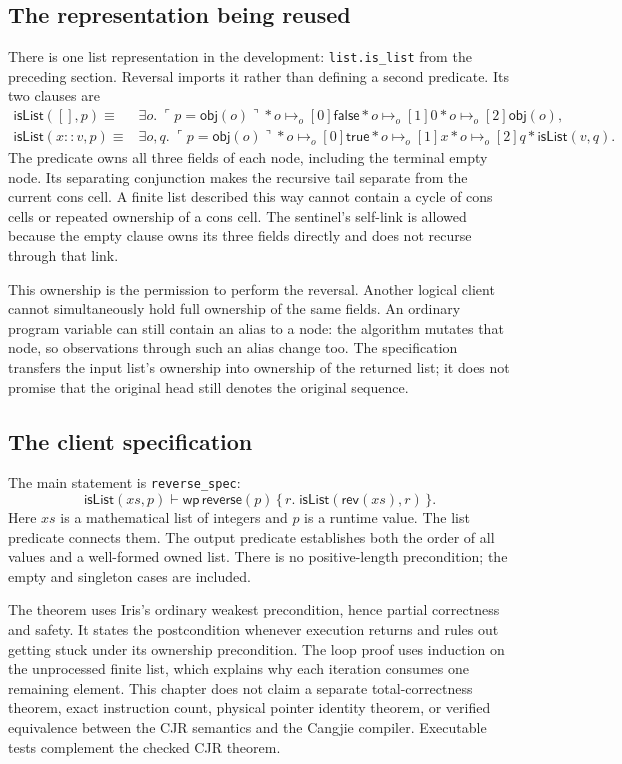 \documentclass[11pt]{article}
\newcommand{\True}{\mathsf{true}}
\newcommand{\False}{\mathsf{false}}
\newcommand{\ptso}{\mathrel{\mapsto_{o}}}
\newcommand{\sep}{\mathbin{*}}
\newcommand{\Wpre}{\mathsf{wp}}
\newcommand{\pure}[1]{\ulcorner #1 \urcorner}
\begin{document}
\subsection{The representation being reused}

There is one list representation in the development: \texttt{list.is\_list}
from the preceding section. Reversal imports it rather than defining a second
predicate. Its two clauses are
\[
\begin{aligned}
\mathsf{isList}([],p) \equiv {}&
 \exists o.\;\pure{p=\mathsf{obj}(o)}
 \sep o\ptso[0]\False \sep o\ptso[1]0 \sep o\ptso[2]\mathsf{obj}(o),\\
\mathsf{isList}(x::v,p) \equiv {}&
 \exists o,q.\;\pure{p=\mathsf{obj}(o)}
 \sep o\ptso[0]\True \sep o\ptso[1]x \sep o\ptso[2]q
 \sep\mathsf{isList}(v,q).
\end{aligned}
\]
The predicate owns all three fields of each node, including the terminal empty
node. Its separating conjunction makes the recursive tail separate from the
current cons cell. A finite list described this way cannot contain a cycle of
cons cells or repeated ownership of a cons cell. The sentinel's self-link is
allowed because the empty clause owns its three fields directly and does not
recurse through that link.

This ownership is the permission to perform the reversal. Another logical
client cannot simultaneously hold full ownership of the same fields. An
ordinary program variable can still contain an alias to a node: the algorithm
mutates that node, so observations through such an alias change too. The
specification transfers the input list's ownership into ownership of the
returned list; it does not promise that the original head still denotes the
original sequence.

\subsection{The client specification}

The main statement is \texttt{reverse\_spec}:
\[
\mathsf{isList}(xs,p)\vdash
 \Wpre\,\mathsf{reverse}(p)
 \,\{\,r.\;\mathsf{isList}(\mathsf{rev}(xs),r)\,\}.
\]
Here \(xs\) is a mathematical list of integers and \(p\) is a runtime value.
The list predicate connects them. The output predicate establishes both the
order of all values and a well-formed owned list. There is no positive-length
precondition; the empty and singleton cases are included.

The theorem uses Iris's ordinary weakest precondition, hence partial
correctness and safety. It states the postcondition whenever execution returns
and rules out getting stuck under its ownership precondition. The loop proof
uses induction on the unprocessed finite list, which explains why each
iteration consumes one remaining element. This chapter does not claim a
separate total-correctness theorem, exact instruction count, physical pointer
identity theorem, or verified equivalence between the CJR semantics and the
Cangjie compiler. Executable tests complement the checked CJR theorem.
\end{document}
